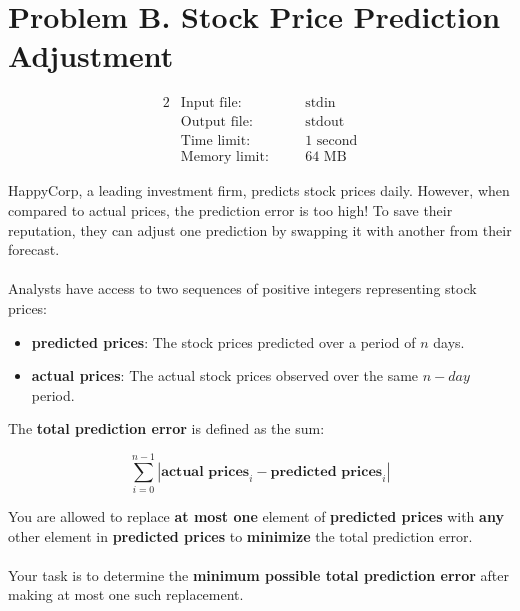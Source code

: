 \documentclass[12pt,a4paper]{article}
\begin{document}
\section*{\fontsize{18}{12}Problem B. Stock Price Prediction Adjustment}

\begin{alignat*} {2}
 &   \text{Input file:}   \quad     &&\text{stdin}\\
 &   \text{Output file:}  \quad     &&\text{stdout}\\
 &   \text{Time limit:}   \quad     &&\text{1 second}\\
 &   \text{Memory limit:} \quad     &&\text{64 MB}
\end{alignat*}

\noindent
HappyCorp, a leading investment firm, predicts stock prices daily. However, when compared to actual prices, the prediction error is too high! To save their reputation, they can adjust one prediction by swapping it with another from their forecast. 
\\\\
\noindent
Analysts have access to two sequences of positive integers representing stock prices:

\begin{itemize}
    \item \textbf{predicted prices}: The stock prices predicted over a period of $n$ days.
    \item \textbf{actual prices}: The actual stock prices observed over the same $n-day$ period.
\end{itemize}

\noindent 
The \textbf{total prediction error} is defined as the sum:

\[
\sum_{i=0}^{n-1} \left| \textbf{actual prices}_i - \textbf{predicted prices}_i \right|
\]

\noindent You are allowed to replace \textbf{at most one} element of \textbf{predicted prices} with \textbf{any} other element in \textbf{predicted prices} to \textbf{minimize} the total prediction error. 
\\\\
\noindent
Your task is to determine the \textbf{minimum possible total prediction error} after making at most one such replacement.
\end{document}
